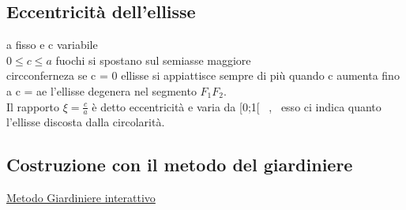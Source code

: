 \documentclass[a4paper,11pt]{article}
\begin{document}
\subsection{Eccentricità dell'ellisse}
a fisso e c variabile
\\
\( 0 \leq c \leq a \) fuochi si spostano sul semiasse maggiore  
\\
circconferneza se c = 0 \hspace{5mm} ellisse si appiattisce sempre di più quando c aumenta fino a c = ae l'ellisse degenera nel segmento \(F_1 F_2\).
\\
Il rapporto \( \xi = \frac{c}{a}     \) è detto eccentricità e varia da [0;1[ \, , \, esso ci indica quanto l'ellisse discosta dalla circolarità.

\subsection{Costruzione con il metodo del giardiniere}
\href{https://www.geogebra.org/m/BNdgyFsW}{Metodo Giardiniere interattivo}
 
\end{document}
